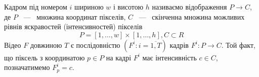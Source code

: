 Кадром під номером $i$ шириною $w$ і висотою $h$ називаємо відображення
$P \to C$, де $P$ ~---~ множина координат пікселів, $C$ ~---~ скінченна множина можливих рівнів
яскравостей (інтенсивностей) пікселів
\begin{equation*}
    P = [1, \ldots ,w]\times[1, \ldots, h], C \subset R
\end{equation*}
Відео \(F\) довжиною \(T\)
є послідовністю \(\left( F^{i}:i = \overline{1,T} \right)\) кадрів
\(F^{i}:P \rightarrow C\). Той факт, що піксель з координатою
\(p \in P\) на кадрі \(F^{i}\) має інтенсивність \(c \in C\),
позначатимемо \(F_{p}^{i} = c\).

\clearpage
